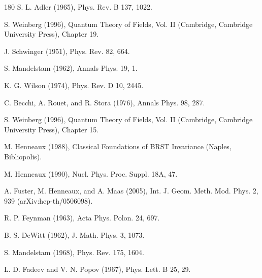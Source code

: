 \begin{thebibliography}{180}
 S. L. Adler (1965), Phys. Rev. B 137, 1022.

 S. Weinberg (1996), Quantum Theory of Fields, Vol. II (Cambridge, Cambridge University Press), Chapter 19.

 J. Schwinger (1951), Phys. Rev. 82, 664.

 S. Mandelstam (1962), Annals Phys. 19, 1.

 K. G. Wilson (1974), Phys. Rev. D 10, 2445.

 C. Becchi, A. Rouet, and R. Stora (1976), Annals Phys. 98, 287.

 S. Weinberg (1996), Quantum Theory of Fields, Vol. II (Cambridge, Cambridge University Press), Chapter 15.

 M. Henneaux (1988), Classical Foundations of BRST Invariance (Naples, Bibliopolis).

 M. Henneaux (1990), Nucl. Phys. Proc. Suppl. 18A, 47.

 A. Fuster, M. Henneaux, and A. Maas (2005), Int. J. Geom. Meth. Mod. Phys. 2, 939 (arXiv:hep-th/0506098).

 R. P. Feynman (1963), Acta Phys. Polon. 24, 697.

 B. S. DeWitt (1962), J. Math. Phys. 3, 1073.

 S. Mandelstam (1968), Phys. Rev. 175, 1604.

 L. D. Fadeev and V. N. Popov (1967), Phys. Lett. B 25, 29.


\end{thebibliography}
